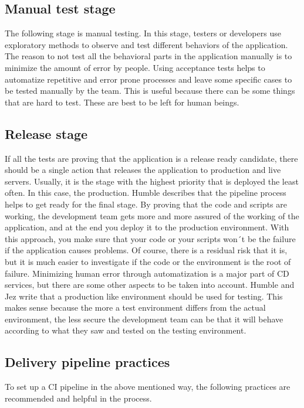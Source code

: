 \subsection{Manual test stage}
The following stage is manual testing. In this stage, testers or developers use exploratory methods to observe and test different behaviors
of the application. The reason to not test all the behavioral parts in the application manually is to minimize the amount of error by people.
Using acceptance tests helps to automatize repetitive and error prone processes and leave some specific cases to be tested manually by the team.
This is useful because there can be some things that are hard to test. These are best to be left for human beings.

\subsection{Release stage}
If all the tests are proving that the application is a release ready candidate, there should be a single action that releases the application to production and
live servers. Usually, it is the stage with the highest priority that is deployed the least often. In this case, the production. Humble describes that the pipeline
process helps to get ready for the final stage. By proving that the code and scripts are working, the development team gets more and more assured of the working of the application, and at the end you deploy it to the production environment. With this approach, you make sure that your code or your scripts won´t be the failure if
the application causes problems. Of course, there is a residual risk that it is, but it is much easier to investigate if the code or the environment is the
root of failure. Minimizing human error through automatization is a major part of CD services, but there are some other aspects to be taken into account. Humble and Jez write
that a production like environment should be used for testing. This makes sense because the more a test environment differs from the actual environment,
the less secure the development team can be that it will behave according to what they saw and tested on the testing environment.

\subsection{Delivery pipeline practices}
To set up a CI pipeline in the above mentioned way, the following practices are recommended and helpful in the process.

